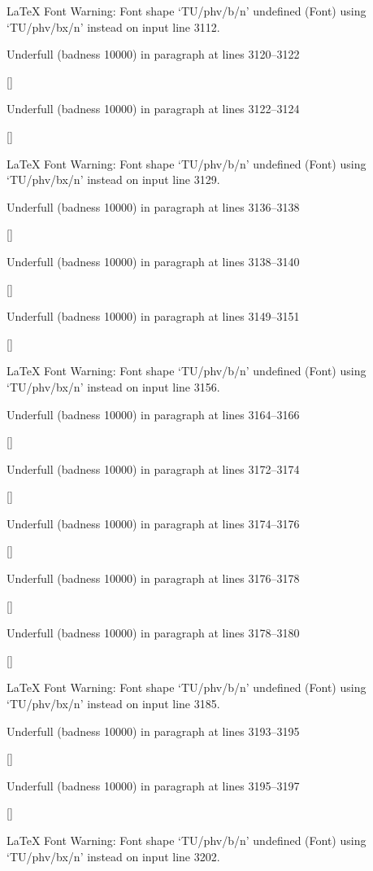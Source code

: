 LaTeX Font Warning: Font shape `TU/phv/b/n' undefined
(Font)              using `TU/phv/bx/n' instead on input line 3112.


Underfull \hbox (badness 10000) in paragraph at lines 3120--3122

 []


Underfull \hbox (badness 10000) in paragraph at lines 3122--3124

 []


LaTeX Font Warning: Font shape `TU/phv/b/n' undefined
(Font)              using `TU/phv/bx/n' instead on input line 3129.


Underfull \hbox (badness 10000) in paragraph at lines 3136--3138

 []


Underfull \hbox (badness 10000) in paragraph at lines 3138--3140

 []


Underfull \hbox (badness 10000) in paragraph at lines 3149--3151

 []


LaTeX Font Warning: Font shape `TU/phv/b/n' undefined
(Font)              using `TU/phv/bx/n' instead on input line 3156.


Underfull \hbox (badness 10000) in paragraph at lines 3164--3166

 []


Underfull \hbox (badness 10000) in paragraph at lines 3172--3174

 []


Underfull \hbox (badness 10000) in paragraph at lines 3174--3176

 []


Underfull \hbox (badness 10000) in paragraph at lines 3176--3178

 []


Underfull \hbox (badness 10000) in paragraph at lines 3178--3180

 []


LaTeX Font Warning: Font shape `TU/phv/b/n' undefined
(Font)              using `TU/phv/bx/n' instead on input line 3185.


Underfull \hbox (badness 10000) in paragraph at lines 3193--3195

 []


Underfull \hbox (badness 10000) in paragraph at lines 3195--3197

 []


LaTeX Font Warning: Font shape `TU/phv/b/n' undefined
(Font)              using `TU/phv/bx/n' instead on input line 3202.


